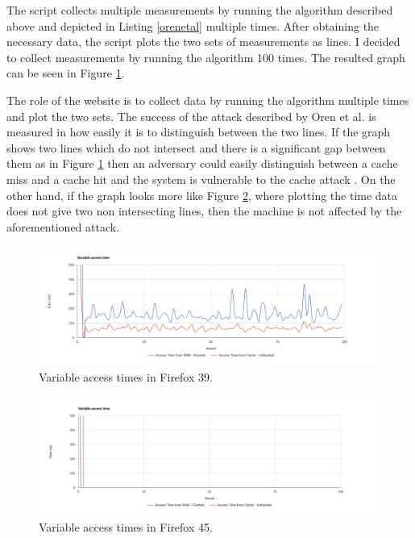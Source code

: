 \documentclass[10pt,a4paper,twoside]{book}
\begin{document}
The script collects multiple measurements by running the algorithm described above and depicted in Listing \ref{orenetal} multiple times. After obtaining the necessary data, the script plots the two sets of measurements as lines. I decided to collect measurements by running the algorithm 100 times. The resulted graph can be seen in Figure \ref{firefox39}.

The role of the website is to collect data by running the algorithm multiple times and plot the two sets. The success of the attack described by Oren et al. \cite{oren2015spy} is measured in how easily it is to distinguish between the two lines. If the graph shows two lines which do not intersect and there is a significant gap between them as in Figure \ref{firefox39} then an adversary could easily distinguish between a cache miss and a cache hit and the system is vulnerable to the cache attack \cite{oren2015spy}. On the other hand, if the graph looks more like Figure \ref{firefox45}, where plotting the time data does not give two non intersecting lines, then the machine is not affected by the aforementioned attack.

\begin{figure}[h]
\centering
\includegraphics[width=\textwidth]{figures/firefox39.png}
\caption{Variable access times in Firefox 39.}
\label{firefox39}
\end{figure}

\begin{figure}[h]
\centering
\includegraphics[width=\textwidth]{figures/firefox45.png}
\caption{Variable access times in Firefox 45.}
\label{firefox45}
\end{figure}
\end{document}
